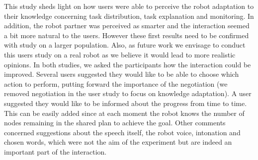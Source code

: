 This study sheds light on how users were able to perceive the robot adaptation to their knowledge concerning task distribution, task explanation and monitoring. In addition, the robot partner was perceived as smarter and the interaction seemed a bit more natural to the users. However these first results need to be confirmed with study on a larger population. Also, as future work we envisage to conduct this users study on a real robot as we believe it would lead to more realistic opinions.
In both studies, we asked the participants how the interaction could be improved. Several users suggested they would like to be able to choose which action to perform, putting forward the importance of the negotiation (we removed negotiation in the user study to focus on knowledge adaptation). A user suggested they would like to be informed about the progress from time to time. This can be easily added since at each moment the robot knows the number of nodes remaining in the shared plan to achieve the goal.
Other comments concerned suggestions about the speech itself, the robot voice, intonation and chosen words, which were not the aim of the experiment but are indeed an important part of the interaction. 

%


